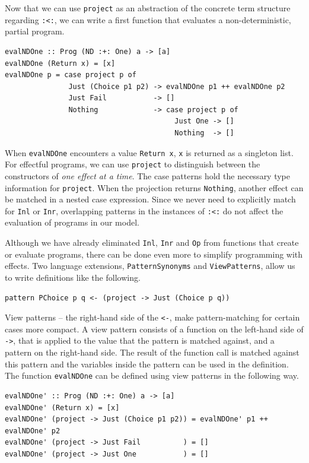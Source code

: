 \documentclass[a4paper, 11pt, fleqn, twoside]{scrreprt}
\newcommand{\hinl}[1]{\texttt{#1}}
\begin{document}
Now that we can use \hinl{project} as an abstraction of the concrete term structure regarding \hinl{:<:}, we can write a first function that evaluates a non-deterministic, partial program.

\begin{verbatim}
evalNDOne :: Prog (ND :+: One) a -> [a]
evalNDOne (Return x) = [x]
evalNDOne p = case project p of
               Just (Choice p1 p2) -> evalNDOne p1 ++ evalNDOne p2
               Just Fail           -> []
               Nothing             -> case project p of
                                        Just One -> []
                                        Nothing  -> []
\end{verbatim}

When \hinl{evalNDOne} encounters a value \hinl{Return x}, \hinl{x} is returned as a singleton list.
For effectful programs, we can use \hinl{project} to distinguish between the constructors of \textit{one effect at a time}.
The case patterns hold the necessary type information for \hinl{project}.
When the projection returns \hinl{Nothing}, another effect can be matched in a nested case expression.
Since we never need to explicitly match for \hinl{Inl} or \hinl{Inr}, overlapping patterns in the instances of \hinl{:<:} do not affect the evaluation of programs in our model.

Although we have already eliminated \hinl{Inl}, \hinl{Inr} and \hinl{Op} from functions that create or evaluate programs, there can be done even more to simplify programming with effects.
Two language extensions, \hinl{PatternSynonyms} and \hinl{ViewPatterns}, allow us to write definitions like the following.

\begin{verbatim}
pattern PChoice p q <- (project -> Just (Choice p q))
\end{verbatim}

View patterns -- the right-hand side of the \hinl{<-}, make pattern-matching for certain cases more compact.
A view pattern consists of a function on the left-hand side of \hinl{->}, that is applied to the value that the pattern is matched against, and a pattern on the right-hand side.
The result of the function call is matched against this pattern and the variables inside the pattern can be used in the definition.
The function \hinl{evalNDOne} can be defined using view patterns in the following way.

\begin{verbatim}
evalNDOne' :: Prog (ND :+: One) a -> [a]
evalNDOne' (Return x) = [x]
evalNDOne' (project -> Just (Choice p1 p2)) = evalNDOne' p1 ++ evalNDOne' p2
evalNDOne' (project -> Just Fail          ) = []
evalNDOne' (project -> Just One           ) = []
\end{verbatim}
\end{document}
